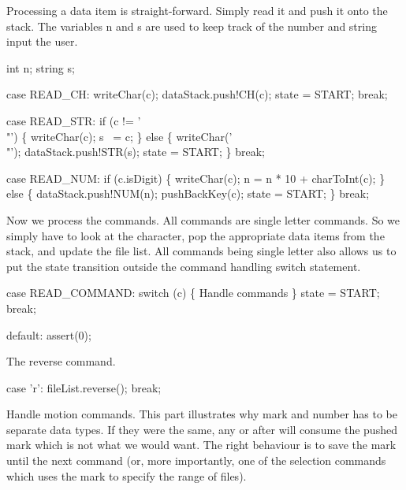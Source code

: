 \nwendcode{}Processing a data item is straight-forward. Simply read it and push
it onto the stack. The variables {\Tt{}n\nwendquote} and {\Tt{}s\nwendquote} are used to keep
track of the number and string input the user.

\nwenddocs{}\plusendmoddef\nwstartdeflinemarkup\nwenddeflinemarkup
int n;
string s;

\nwendcode{}\endmoddef\nwstartdeflinemarkup\nwenddeflinemarkup
case READ_CH:
  writeChar(c);
  dataStack.push!CH(c);
  state = START;
  break;

case READ_STR:
  if (c != '\\"') \{
    writeChar(c);
    s ~= c;
  \} else \{
    writeChar('\\"');
    dataStack.push!STR(s);
    state = START;
  \}
  break;

case READ_NUM:
  if (c.isDigit) \{
    writeChar(c);
    n = n * 10 + charToInt(c);
  \} else \{
    dataStack.push!NUM(n);
    pushBackKey(c);
    state = START;
  \}
  break;

\nwendcode{}Now we process the commands. All commands are single letter
commands. So we simply have to look at the character, pop the
appropriate data items from the stack, and update the file list. All
commands being single letter also allows us to put the state
transition outside the command handling {\Tt{}switch\nwendquote} statement.

\nwenddocs{}\endmoddef\nwstartdeflinemarkup\nwenddeflinemarkup
case READ_COMMAND:
  switch (c) \{
    \LA{}Handle commands\RA{}
  \}
  state = START;
  break;

default: assert(0);

\nwendcode{}The reverse command.

\nwenddocs{}\endmoddef\nwstartdeflinemarkup\nwenddeflinemarkup
case 'r':
  fileList.reverse(); break;

\nwendcode{}Handle motion commands. This part illustrates why mark and number
has to be separate data types. If they were the same, any  or
 after  will consume the pushed mark which is not what
we would want. The right behaviour is to save the mark until the next
\unix{;} command (or, more importantly, one of the selection commands
which uses the mark to specify the range of files).

